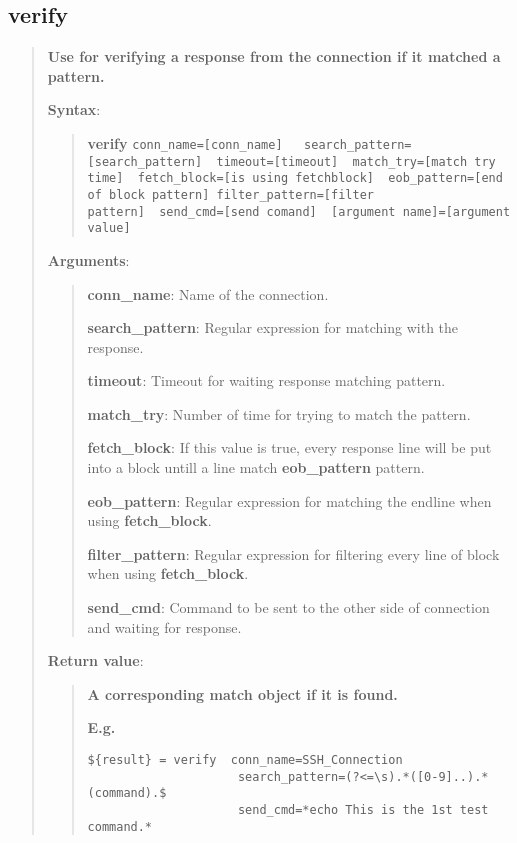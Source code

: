 \hypertarget{description-verify}{%
\subsection{\texorpdfstring{\textbf{verify}}{verify}}\label{description-verify}}

\begin{quote}
\textbf{Use for verifying a response from the connection if it matched a pattern.}

\textbf{Syntax}:

\begin{quote}
\textbf{verify}
\texttt{conn\_name={[}conn\_name{]}\ \ \ search\_pattern={[}search\_pattern{]}\ \ timeout={[}timeout{]}\ \ match\_try={[}match try time{]}\ \ fetch\_block={[}is using fetchblock{]}\ \ eob\_pattern={[}end of block pattern{]}\ filter\_pattern={[}filter pattern{]}\ \ send\_cmd={[}send comand{]}\ \ {[}argument name{]}={[}argument value{]}}
\end{quote}

\textbf{Arguments}:

\begin{quote}
\textbf{conn\_name}: Name of the connection.

\textbf{search\_pattern}: Regular expression for matching with the response.

\textbf{timeout}: Timeout for waiting response matching pattern.

\textbf{match\_try}: Number of time for trying to match the pattern.

\textbf{fetch\_block}: If this value is true, every response line will be put into a block untill a line match \textbf{eob\_pattern} pattern.

\textbf{eob\_pattern}: Regular expression for matching the endline when using \textbf{fetch\_block}.

\textbf{filter\_pattern}: Regular expression for filtering every line of block when using \textbf{fetch\_block}.

\textbf{send\_cmd}: Command to be sent to the other side of connection and waiting for response.
\end{quote}

\textbf{Return value}:

\begin{quote}
\textbf{A corresponding match object if it is found.}

\textbf{E.g.}

\begin{verbatim}
${result} = verify  conn_name=SSH_Connection
                     search_pattern=(?<=\s).*([0-9]..).*(command).$
                     send_cmd=*echo This is the 1st test command.*
\end{verbatim}


\end{quote}
\end{quote}
